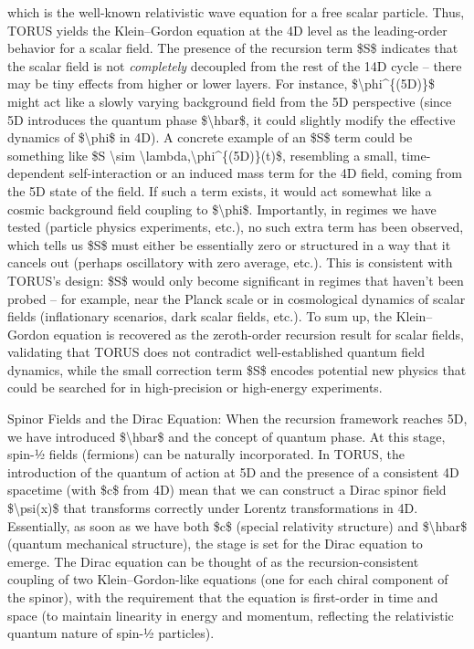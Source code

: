 \documentclass[]{article}
\begin{document}
which is the well-known relativistic wave equation for a free scalar
particle. Thus, TORUS yields the Klein--Gordon equation at the 4D level
as the leading-order behavior for a scalar field. The presence of the
recursion term \$S\$ indicates that the scalar field is not
\emph{completely} decoupled from the rest of the 14D cycle -- there may
be tiny effects from higher or lower layers. For instance,
\$\textbackslash{}phi\^{}\{(5D)\}\$ might act like a slowly varying
background field from the 5D perspective (since 5D introduces the
quantum phase \$\textbackslash{}hbar\$, it could slightly modify the
effective dynamics of \$\textbackslash{}phi\$ in 4D). A concrete example
of an \$S\$ term could be something like \$S \textbackslash{}sim
\textbackslash{}lambda,\textbackslash{}phi\^{}\{(5D)\}(t)\$, resembling
a small, time-dependent self-interaction or an induced mass term for the
4D field, coming from the 5D state of the field. If such a term exists,
it would act somewhat like a cosmic background field coupling to
\$\textbackslash{}phi\$. Importantly, in regimes we have tested
(particle physics experiments, etc.), no such extra term has been
observed, which tells us \$S\$ must either be essentially zero or
structured in a way that it cancels out (perhaps oscillatory with zero
average, etc.). This is consistent with TORUS's design: \$S\$ would only
become significant in regimes that haven't been probed -- for example,
near the Planck scale or in cosmological dynamics of scalar fields
(inflationary scenarios, dark scalar fields, etc.). To sum up, the
Klein--Gordon equation is recovered as the zeroth-order recursion result
for scalar fields, validating that TORUS does not contradict
well-established quantum field dynamics, while the small correction term
\$S\$ encodes potential new physics that could be searched for in
high-precision or high-energy experiments.

Spinor Fields and the Dirac Equation: When the recursion framework
reaches 5D, we have introduced \$\textbackslash{}hbar\$ and the concept
of quantum phase. At this stage, spin-½ fields (fermions) can be
naturally incorporated. In TORUS, the introduction of the quantum of
action at 5D and the presence of a consistent 4D spacetime (with \$c\$
from 4D) mean that we can construct a Dirac spinor field
\$\textbackslash{}psi(x)\$ that transforms correctly under Lorentz
transformations in 4D. Essentially, as soon as we have both \$c\$
(special relativity structure) and \$\textbackslash{}hbar\$ (quantum
mechanical structure), the stage is set for the Dirac equation to
emerge. The Dirac equation can be thought of as the recursion-consistent
coupling of two Klein--Gordon-like equations (one for each chiral
component of the spinor), with the requirement that the equation is
first-order in time and space (to maintain linearity in energy and
momentum, reflecting the relativistic quantum nature of spin-½
particles).
\end{document}
